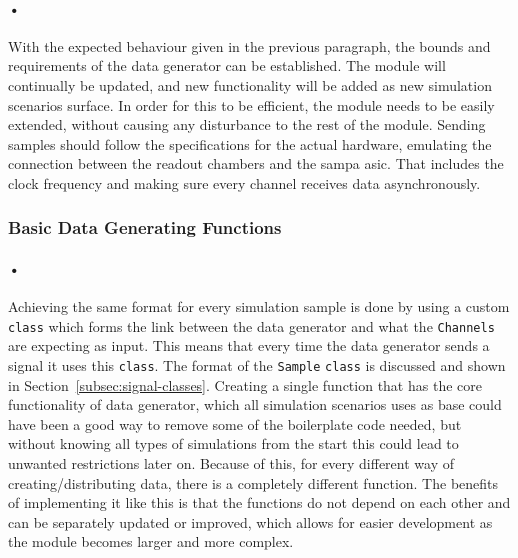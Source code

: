 \documentclass[a4paper, 12pt]{report}
\newcommand{\codeword}[1]{\texttt{#1}}
\begin{document}
\paragraph{•}
With the expected behaviour given in the previous paragraph, the bounds and requirements of the data generator can be established.
The module will continually be updated, and new functionality will be added as new simulation scenarios surface. 
In order for this to be efficient, the module needs to be easily extended, without causing any disturbance to the rest of the module.
Sending samples should follow the specifications for the actual hardware, emulating the connection between the readout chambers and the \gls{sampa} \gls{asic}.
That includes the clock frequency and making sure every channel receives data asynchronously.

\subsubsection{Basic Data Generating Functions}

\paragraph{•}
Achieving the same format for every simulation sample is done by using a custom \codeword{class} which forms the link between the data generator and what the \codeword{Channels} are expecting as input.
This means that every time the data generator sends a signal it uses this \codeword{class}.
The format of the \codeword{Sample} \codeword{class} is discussed and shown in Section~\ref{subsec:signal-classes}.
Creating a single function that has the core functionality of data generator, which all simulation scenarios uses as base could have been a good way to remove some of the boilerplate code needed, but without knowing all types of simulations from the start this could lead to unwanted restrictions later on.
Because of this, for every different way of creating/distributing data, there is a completely different function.
The benefits of implementing it like this is that the functions do not depend on each other and can be separately updated or improved, which allows for easier development as the module becomes larger and more complex.
\end{document}

